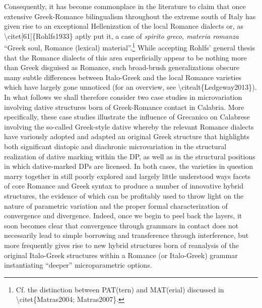 \documentclass[12pt]{article}
\newenvironment{styleStandard}{\setlength\leftskip{0cm}\setlength\rightskip{0cm plus 1fil}\setlength\parindent{0cm}\setlength\parfillskip{0pt plus 1fil}\setlength\parskip{0cm plus 1pt}\writerlistparindent\writerlistleftskip\leavevmode\normalfont\normalsize\writerlistlabel\ignorespaces}{\unskip\vspace{0cm plus 1pt}\par}
\newcommand\writerlistleftskip{}
\newcommand\writerlistparindent{}
\newcommand\writerlistlabel{}
\begin{document}
\begin{styleStandard}
Consequently, it has become commonplace in the literature to claim that once extensive Greek-Romance bilingualism throughout the extreme south of Italy has given rise to an exceptional Hellenization of the local Romance dialects or, as {\textbackslash}citet[61]\{Rohlfs1933\} aptly put it, a case of \textit{spirito greco, materia romanza }“Greek soul, Romance (lexical) material”.\footnote{ Cf. the distinction between PAT(tern) and MAT(erial) discussed in {\textbackslash}citet\{Matras2004; Matras2007\}.} While accepting Rohlfs’ general thesis that the Romance dialects of this area superficially appear to be nothing more than Greek disguised as Romance, such broad-brush generalizations obscure many subtle differences between Italo-Greek and the local Romance varieties which have largely gone unnoticed (for an overview, see {\textbackslash}citealt\{Ledgeway2013\}). In what follows we shall therefore consider two case studies in microvariation involving dative structures born of Greek-Romance contact in Calabria. More specifically, these case studies illustrate the influence of Grecanico on Calabrese involving the so-called Greek-style dative whereby the relevant Romance dialects have variously adopted and adapted an original Greek structure that highlights both significant diatopic and diachronic microvariation in the structural realization of dative marking within the DP, as well as in the structural positions in which dative-marked DPs are licensed. In both cases, the varieties in question marry together in still poorly explored and largely little understood ways facets of core Romance and Greek syntax to produce a number of innovative hybrid structures, the evidence of which can be profitably used to throw light on the nature of parametric variation and the proper formal characterization of convergence and divergence. Indeed, once we begin to peel back the layers, it soon becomes clear that convergence through grammars in contact does not necessarily lead to simple borrowing and transference through interference, but more frequently gives rise to new hybrid structures born of reanalysis of the original Italo-Greek structures within a Romance (or Italo-Greek) grammar instantiating “deeper” microparametric options.
\end{styleStandard}
\end{document}
